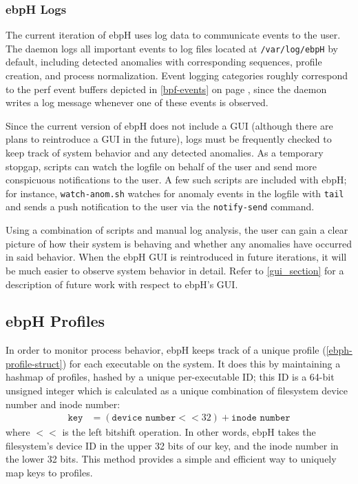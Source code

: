 \documentclass[
  12pt]{findlay}
\newcommand{\passthrough}[1]{#1}
\begin{document}
\hypertarget{ebph-logs}{%
\subsubsection{ebpH Logs}\label{ebph-logs}}

The current iteration of ebpH uses log data to communicate events to the
user. The daemon logs all important events to log files located at
\passthrough{\lstinline!/var/log/ebpH!} by default, including detected
anomalies with corresponding sequences, profile creation, and process
normalization. Event logging categories roughly correspond to the perf
event buffers depicted in \autoref{bpf-events} on page
\pageref{bpf-events}, since the daemon writes a log message whenever one
of these events is observed.

Since the current version of ebpH does not include a GUI (although there
are plans to reintroduce a GUI in the future), logs must be frequently
checked to keep track of system behavior and any detected anomalies. As
a temporary stopgap, scripts can watch the logfile on behalf of the user
and send more conspicuous notifications to the user. A few such scripts
are included with ebpH; for instance,
\passthrough{\lstinline!watch-anom.sh!} watches for anomaly events in
the logfile with \passthrough{\lstinline!tail!} and sends a push
notification to the user via the \passthrough{\lstinline!notify-send!}
command.

Using a combination of scripts and manual log analysis, the user can
gain a clear picture of how their system is behaving and whether any
anomalies have occurred in said behavior. When the ebpH GUI is
reintroduced in future iterations, it will be much easier to observe
system behavior in detail. Refer to \autoref{gui_section} for a
description of future work with respect to ebpH's GUI.

\hypertarget{ebph-profiles}{%
\subsection{ebpH Profiles}\label{ebph-profiles}}

\label{ebph_profiles}

In order to monitor process behavior, ebpH keeps track of a unique
profile (\autoref{ebph-profile-struct}) for each executable on the
system. It does this by maintaining a hashmap of profiles, hashed by a
unique per-executable ID; this ID is a 64-bit unsigned integer which is
calculated as a unique combination of filesystem device number and inode
number: \begin{align*}
\texttt{key} &= (\texttt{device number} << 32) + \texttt{inode number}
\end{align*} where \(<<\) is the left bitshift operation. In other
words, ebpH takes the filesystem's device ID in the upper 32 bits of our
key, and the inode number in the lower 32 bits. This method provides a
simple and efficient way to uniquely map keys to profiles.
\end{document}
